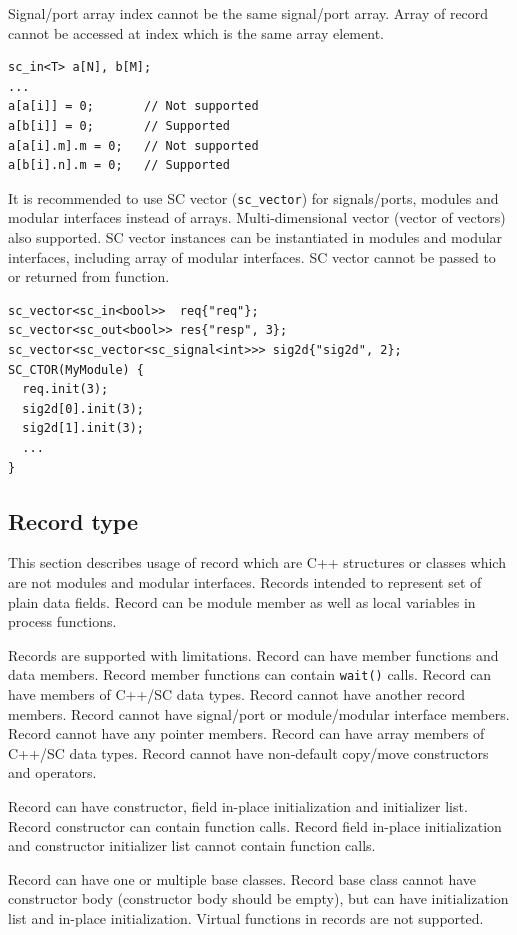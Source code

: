  
Signal/port array index cannot be the same signal/port array. Array of record cannot be accessed at index which is the same array element.
%
\begin{lstlisting}[style=mycpp]
sc_in<T> a[N], b[M]; 
...
a[a[i]] = 0;       // Not supported 
a[b[i]] = 0;       // Supported
a[a[i].m].m = 0;   // Not supported 
a[b[i].n].m = 0;   // Supported
\end{lstlisting}

It is recommended to use SC vector ({\tt sc\_vector}) for signals/ports, modules and modular interfaces instead of arrays. Multi-dimensional vector (vector of vectors) also supported. SC vector instances can be instantiated in modules and modular interfaces, including array of modular interfaces. SC vector cannot be passed to or returned from function.
%
\begin{lstlisting}[style=mycpp]
sc_vector<sc_in<bool>>  req{"req"};
sc_vector<sc_out<bool>> res{"resp", 3};
sc_vector<sc_vector<sc_signal<int>>> sig2d{"sig2d", 2};
SC_CTOR(MyModule) {
  req.init(3);
  sig2d[0].init(3);
  sig2d[1].init(3);        
  ...
}
\end{lstlisting}



\subsection{Record type}

This section describes usage of record which are C++ structures or classes which are not modules and modular interfaces. Records intended to represent set of plain data fields. Record can be module member as well as local variables in process functions. 

Records are supported with limitations. Record can have member functions and data members. Record member functions can contain {\tt wait()} calls. Record can have members of C++/SC data types. Record cannot have another record members. Record cannot have signal/port or module/modular interface members. Record cannot have any pointer members. Record can have array members of C++/SC data types. Record cannot have non-default copy/move constructors and operators.

Record can have constructor, field in-place initialization and initializer list. Record constructor can contain function calls. Record field in-place initialization and constructor initializer list cannot contain function calls.

Record can have one or multiple base classes. Record base class cannot have constructor body (constructor body should be empty), but can have initialization list and in-place initialization. Virtual functions in records are not supported.

